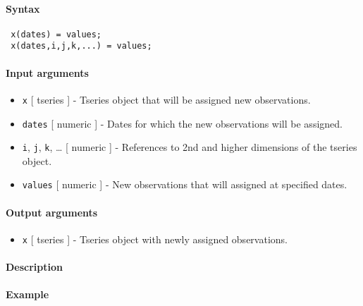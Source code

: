


	\paragraph{Syntax}
 
 \begin{verbatim}
 x(dates) = values;
 x(dates,i,j,k,...) = values;
 \end{verbatim}
 
 \paragraph{Input arguments}
 
 \begin{itemize}
 \item
   \texttt{x} {[} tseries {]} - Tseries object that will be assigned new
   observations.
 \item
   \texttt{dates} {[} numeric {]} - Dates for which the new observations
   will be assigned.
 \item
   \texttt{i}, \texttt{j}, \texttt{k}, \ldots{} {[} numeric {]} -
   References to 2nd and higher dimensions of the tseries object.
 \item
   \texttt{values} {[} numeric {]} - New observations that will assigned
   at specified dates.
 \end{itemize}
 
 \paragraph{Output arguments}
 
 \begin{itemize}
 \item
   \texttt{x} {[} tseries {]} - Tseries object with newly assigned
   observations.
 \end{itemize}
 
 \paragraph{Description}
 
 \paragraph{Example}


